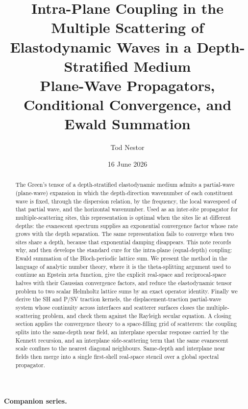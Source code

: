 \documentclass[11pt,a4paper]{article}
\title{\bfseries Intra-Plane Coupling in the Multiple Scattering of
Elastodynamic Waves in a Depth-Stratified Medium\\[4pt]
\large Plane-Wave Propagators, Conditional Convergence, and Ewald Summation}
\author{Tod Nestor}
\date{16 June 2026}
\begin{document}
\maketitle

\begin{abstract}
The Green's tensor of a depth-stratified elastodynamic medium admits a partial-wave
(plane-wave) expansion in which the depth-direction wavenumber of each constituent wave
is fixed, through the dispersion relation, by the frequency, the local wavespeed of that
partial wave, and the horizontal wavenumber. Used as an inter-site propagator for
multiple-scattering sites, this representation is optimal when the sites lie at different
depths: the evanescent spectrum supplies an exponential convergence factor whose rate
grows with the depth separation. The same representation fails to converge when two sites
share a depth, because that exponential damping disappears. This note records why, and
then develops the standard cure for the intra-plane (equal-depth) coupling: Ewald
summation of the Bloch-periodic lattice sum. We present the method in the language of
analytic number theory, where it is the theta-splitting argument used to continue an
Epstein zeta function, give the explicit real-space and reciprocal-space halves with their
Gaussian convergence factors, and reduce the elastodynamic tensor problem to two scalar
Helmholtz lattice sums by an exact operator identity. Finally we derive the SH and P/SV
traction kernels, the displacement-traction partial-wave system whose continuity across
interfaces and scatterer surfaces closes the multiple-scattering problem, and check them
against the Rayleigh secular equation. A closing section applies the convergence theory to a
space-filling grid of scatterers: the coupling splits into the same-depth near field, an
interplane specular response carried by the Kennett recursion, and an interplane
side-scattering term that the same evanescent scale confines to the nearest diagonal
neighbours. Same-depth and interplane near fields then merge into a single first-shell
real-space stencil over a global spectral propagator.
\end{abstract}

\bigskip
\noindent\textbf{Companion series.}
\end{document}

